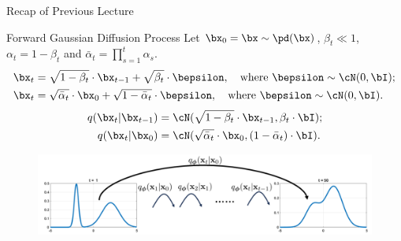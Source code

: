 \documentclass{beamer}
\begin{document}
\begin{frame}{Recap of Previous Lecture}
    \begin{block}{Forward Gaussian Diffusion Process}
        Let $\bx_0 = \bx \sim \pd(\bx)$, $\beta_t \ll 1$, $\alpha_t = 1 - \beta_t$ and $\bar{\alpha}_t = \prod_{s=1}^t \alpha_s$. 
        \begin{align*}
            \bx_t &= \sqrt{1 - \beta_t} \cdot \bx_{t - 1} + \sqrt{\beta_t} \cdot \bepsilon, \quad \text{where }\bepsilon \sim \cN(0, \bI); \\
            \bx_t &= \sqrt{\bar{\alpha}_t} \cdot \bx_{0} + \sqrt{1 - \bar{\alpha}_t} \cdot \bepsilon, \quad \text{where } \bepsilon \sim \cN(0, \bI).
        \end{align*}
        \vspace{-0.6cm}
        \begin{align*}
            q(\bx_t | \bx_{t-1}) &= \cN(\sqrt{1 - \beta_t} \cdot \bx_{t-1}, \beta_t \cdot \bI); \\
            q(\bx_t | \bx_0) &= \cN(\sqrt{\bar{\alpha}_t} \cdot \bx_0, (1 - \bar{\alpha}_t) \cdot \bI).
        \end{align*}
        \vspace{-0.6cm}
    \end{block}
    \begin{figure}
        \includegraphics[width=0.8\linewidth]{figs/conditional_diffusion}
    \end{figure}
\end{frame}
\end{document}
